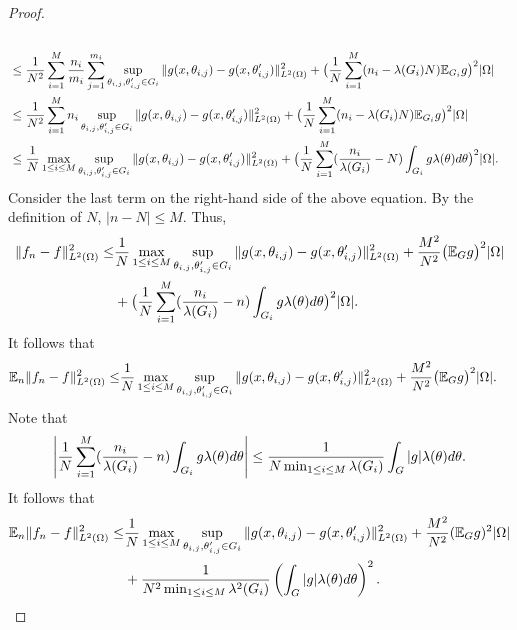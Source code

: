 \begin{proof}
\begin{align}
\\
&\le {1\over N^2}\sum_{i=1}^M {n_i\over m_i} \sum_{j=1}^{m_i} \sup_{\theta_{i, j},\theta_{i, j}'\in G_i} \| g(x,\theta_{i, j}) - g(x,\theta_{i,j}')\|^2_{L^2(\Omega)} 
+ \big ({1\over N}\sum_{i=1}^M (n_i - \lambda(G_i)N)  \mathbb{E}_{G_i}g\big )^2|\Omega|
\\
&\le {1\over N^2}\sum_{i=1}^M n_i\sup_{\theta_{i, j},\theta_{i, j}'\in G_i} \| g(x,\theta_{i, j}) - g(x,\theta_{i,j}')\|^2_{L^2(\Omega)}
+ \big ({1\over N}\sum_{i=1}^M (n_i - \lambda(G_i)N)  \mathbb{E}_{G_i}g\big )^2|\Omega|
\\
&\le {1\over N} \max_{1\le i\le M}\sup_{\theta_{i, j},\theta_{i, j}'\in G_i} \| g(x,\theta_{i, j}) - g(x,\theta_{i,j}')\|^2_{L^2(\Omega)}
+ \big ({1\over N}\sum_{i=1}^M ({n_i\over \lambda(G_i)} - N)  \int_{G_i}g\lambda(\theta)d\theta\big )^2|\Omega|.
\end{align} 
Consider the last term on the right-hand side of the above equation. By the definition of $N$, $|n-N|\le M$. 
Thus,
\begin{align}  
\|f_n - f \|_{L^2(\Omega)}^2 \le& {1\over N} \max_{1\le i\le M}\sup_{\theta_{i, j},\theta_{i, j}'\in G_i} \| g(x,\theta_{i, j}) - g(x,\theta_{i,j}')\|^2_{L^2(\Omega)}
+ {M^2\over N^2} \big (\mathbb{E}_{G}g \big )^2|\Omega|
\\
&
+ \big ({1\over N}\sum_{i=1}^M ({n_i\over \lambda(G_i)} - n)  \int_{G_i}g\lambda(\theta)d\theta\big )^2|\Omega|.
\end{align} 
It follows that 
\begin{align}  
\mathbb{E}_n \|f_n - f \|_{L^2(\Omega)}^2 
\le &{1\over N} \max_{1\le i\le M}\sup_{\theta_{i, j},\theta_{i, j}'\in G_i} \| g(x,\theta_{i, j}) - g(x,\theta_{i,j}')\|^2_{L^2(\Omega)}
+ {M^2\over N^2} \big (\mathbb{E}_{G}g \big )^2|\Omega|\label{stratify2t}.
\end{align}   
Note that 
$$
\displaystyle \left |{1\over N}\sum_{i=1}^M ({n_i\over \lambda(G_i)} - n)  \int_{G_i}g\lambda(\theta)d\theta \right |
\le {1\over N\min_{1\le i\le M}\lambda(G_i)}  \int_{G} |g|\lambda(\theta)d\theta .
$$
It follows that
\begin{align}  
\mathbb{E}_n \|f_n - f \|_{L^2(\Omega)}^2 
\le &{1\over N} \max_{1\le i\le M}\sup_{\theta_{i, j},\theta_{i, j}'\in G_i} \| g(x,\theta_{i, j}) - g(x,\theta_{i,j}')\|^2_{L^2(\Omega)} + {M^2\over N^2} (\mathbb{E}_{G}g )^2|\Omega|
\\
&+{1\over N^2\min_{1\le i\le M}\lambda^2(G_i)}  \left (\int_{G} |g|\lambda(\theta)d\theta\right )^2.
\end{align}  

\end{proof}
